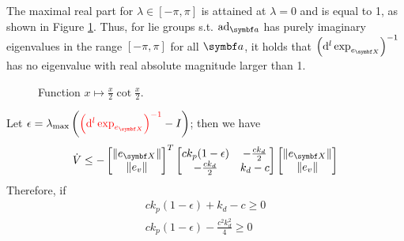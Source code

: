 The maximal real part for $\lambda \in [-\pi, \pi]$ is attained at $\lambda = 0$ and is equal to 1, as shown in Figure \ref{fig:cot_fcn}. Thus, for lie groups s.t. $\ad_\a$ has purely imaginary eigenvalues in the range $[-\pi, \pi]$ for all $\a$, it holds that $\left( \mathrm{d}^l \exp_{e_\X} \right)^{-1}$ has no eigenvalue with real absolute magnitude larger than 1.

\begin{figure}
  \begin{center}
  \end{center}
  \caption{Function $x \mapsto \frac{x}{2} \cot \frac{x}{2}$.}
  \label{fig:cot_fcn}
\end{figure}

Let $\epsilon = \lambda_\textrm{max} \left( \textcolor{red}{\left(\mathrm{d}^l \exp_{e_\X} \right)^{-1}} - I \right)$; then we have
\begin{equation}
  \dot V \leq -\begin{bmatrix} \| e_\X \| \\ \| e_v \| \end{bmatrix}^T \begin{bmatrix} c k_p (1 - \epsilon) & -\frac{c k_d}{2} \\ -\frac{c k_d}{2} & k_d - c \end{bmatrix} \begin{bmatrix} \| e_\X \| \\ \| e_v \| \end{bmatrix}
\end{equation}
Therefore, if
\begin{equation}
  \begin{aligned}
    c k_p (1 - \epsilon) + k_d - c \geq 0 \\
    c k_p (1 - \epsilon) - \frac{c^2 k_d^2}{4}  \geq 0
  \end{aligned}
\end{equation}